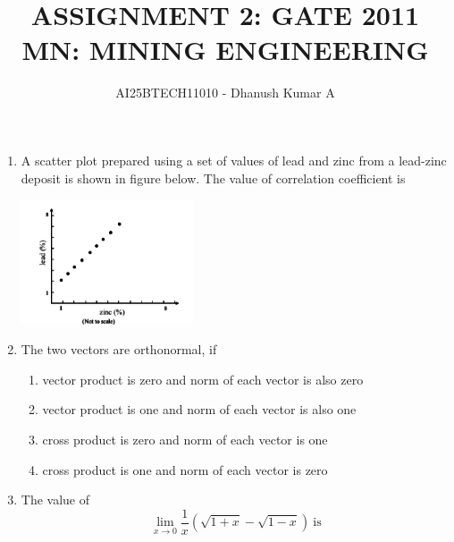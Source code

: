 \documentclass[journal]{IEEEtran}
\begin{document}
\title{ASSIGNMENT 2: GATE 2011 \\
MN: MINING ENGINEERING}
\author{AI25BTECH11010 - Dhanush Kumar A}
\maketitle
 \renewcommand{\thefigure}{\theenumi}
 \renewcommand{\thetable}{\theenumi}
\begin{enumerate}

\item A scatter plot prepared using a set of values of lead and zinc from a lead-zinc deposit is shown in figure below. The value of correlation coefficient is

\begin{center}
\includegraphics[width=0.4\textwidth]{Screenshot_2025_0813_154158.png} 
\end{center}

\begin{enumerate}
\end{enumerate}

\item The two vectors are orthonormal, if
\begin{enumerate}

    \item vector product is zero and norm of each vector is also zero
    \item vector product is one and norm of each vector is also one
    \item cross product is zero and norm of each vector is one
    \item cross product is one and norm of each vector is zero
    
\end{enumerate}

\item The value of 
\[
\lim_{x \to 0} \frac{1}{x} \left( \sqrt{1+x} - \sqrt{1-x} \right) \ \text{is}
\]
\begin{enumerate}
\end{enumerate}


\end{enumerate}
\end{document}
